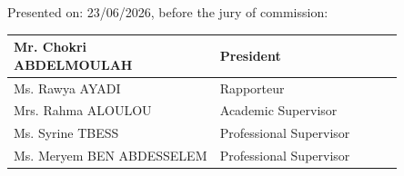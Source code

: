 \begin{titlepage}
\begin{center}
\vspace{40pt}
Presented on: 23/06/2026, before the jury of commission: \\
\vspace{20pt}
\begin{tabular}{|p{0.45\linewidth}| p{0.4\linewidth}|}
\hline
  Mr. Chokri ABDELMOULAH & President \\ \hline
  Ms. Rawya AYADI & Rapporteur\\ \hline
  Mrs. Rahma ALOULOU & Academic Supervisor\\ \hline
  Ms. Syrine TBESS & Professional Supervisor\\ \hline
  Ms. Meryem BEN ABDESSELEM & Professional Supervisor\\ \hline
\end{tabular}

\vfill

\end{center}
\end{titlepage}